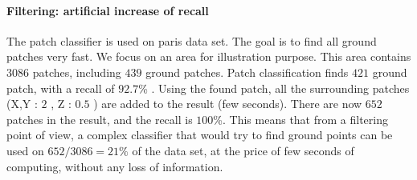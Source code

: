 				
			\paragraph{Filtering: artificial increase of recall}
				The patch classifier is used on paris data set.
				The goal is to find all ground patches very fast.
				We focus on an area for illustration purpose. This area contains $3086$ patches, including $439$ ground patches.
				Patch classification finds $421$ ground patch, 
				with a recall of $92.7$\% .
				Using the found patch, all the surrounding patches (X,Y : $2$ \meter, Z : $0.5$ \meter ) are added to the result (few seconds).
				There are now $652$ patches in the result, and the recall is $100$\%.
				This means that from a filtering point of view, a complex classifier that would try to find ground points can be used on $652/3086=21\%$ of the data set, at the price of few seconds of computing, without any loss of information.
				
					 	  